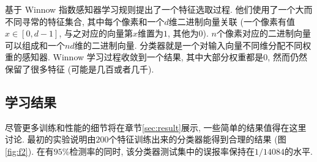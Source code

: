 \documentclass[a4paper,utf8,11pt, onecolumn]{ctexart}
\begin{document}
\citet{yang2000snow}基于 Winnow 指数感知器学习规则提出了一个特征选取过程. 他们使用了一个大而不同寻常的特征集合, 其中每个像素和一个$d$维二进制向量关联 (一个像素有值$x\in[0, d-1]$, 与之对应的向量第$x$维置为$1$, 其他为$0$). $n$个像素对应的二进制向量可以组成和一个$nd$维的二进制向量. 分类器就是一个对输入向量不同维分配不同权重的感知器. Winnow 学习过程收敛到一个结果, 其中大部分权重都是$0$, 然而仍然保留了很多特征 (可能是几百或者几千).

\subsection{学习结果}
尽管更多训练和性能的细节将在章节\ref{sec:result}展示, 一些简单的结果值得在这里讨论. 最初的实验说明由$200$个特征训练出来的分类器能得到合理的结果 (图\ref{fig:f2}). 在有$95\%$检测率的同时, 该分类器测试集中的误报率保持在$1/14084$的水平.
\end{document}
